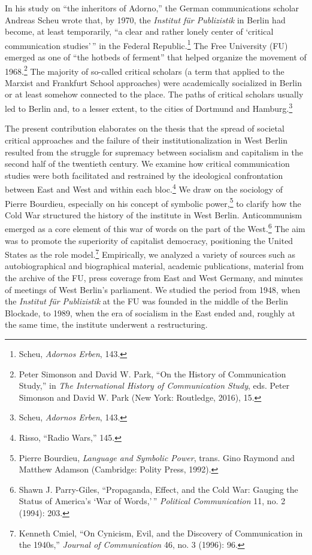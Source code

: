 \documentclass{tufte-handout}
\begin{document}
In his study on ``the inheritors of Adorno,'' the German communications
scholar Andreas Scheu wrote that, by 1970, the \emph{Institut für
Publizistik} in Berlin had become, at least temporarily, ``a clear and
rather lonely center of `critical communication studies'\,'' in the
Federal Republic.\footnote{Scheu, \emph{Adornos Erben}, 143.} The Free
University (FU) emerged as one of ``the hotbeds of ferment'' that helped
organize the movement of 1968.\footnote{Peter Simonson and David W.
  Park, ``On the History of Communication Study,'' in \emph{The
  International History of Communication Study}, eds. Peter Simonson and
  David W. Park (New York: Routledge, 2016), 15.} The majority of
so-called critical scholars (a term that applied to the Marxist and
Frankfurt School approaches) were academically socialized in Berlin or
at least somehow connected to the place. The paths of critical scholars
usually led to Berlin and, to a lesser extent, to the cities of Dortmund
and Hamburg.\footnote{Scheu, \emph{Adornos Erben}, 143.}

The present contribution elaborates on the thesis that the spread of
societal critical approaches and the failure of their
institutionalization in West Berlin resulted from the struggle for
supremacy between socialism and capitalism in the second half of the
twentieth century. We examine how critical communication studies were
both facilitated and restrained by the ideological confrontation between
East and West and within each bloc.\footnote{Risso, ``Radio Wars,'' 145.}
We draw on the sociology of Pierre Bourdieu, especially on his concept
of symbolic power,\footnote{Pierre Bourdieu, \emph{Language and Symbolic
  Power}, trans. Gino Raymond and Matthew Adamson (Cambridge: Polity
  Press, 1992).} to clarify how the Cold War structured the history of
the institute in West Berlin. Anticommunism emerged as a core element of
this war of words on the part of the West.\footnote{Shawn J.
  Parry-Giles, ``Propaganda, Effect, and the Cold War: Gauging the
  Status of America's `War of Words,'\,'' \emph{Political Communication}
  11, no. 2 (1994): 203.} The aim was to promote the superiority of
capitalist democracy, positioning the United States as the role
model.\footnote{Kenneth Cmiel, ``On Cynicism, Evil, and the Discovery of
  Communication in the 1940s,'' \emph{Journal of Communication} 46, no.
  3 (1996): 96.} Empirically, we analyzed a variety of sources such as
autobiographical and biographical material, academic publications,
material from the archive of the FU, press coverage from East and West
Germany, and minutes of meetings of West Berlin's parliament. We studied
the period from 1948, when the \emph{Institut für Publizistik} at the FU
was founded in the middle of the Berlin Blockade, to 1989, when the era
of socialism in the East ended and, roughly at the same time, the
institute underwent a restructuring.
\end{document}
